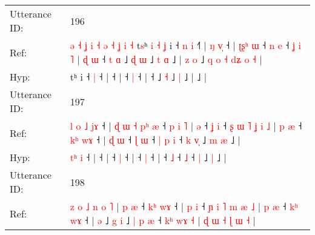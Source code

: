 \documentclass[10pt]{article}
\DeclareRobustCommand{\hl}[1]{{\textcolor{red}{#1}}}
\begin{document}
\begin{longtable}{ll}
 \\
\midrule
Utterance ID: & 196 \\
Ref: & \hl{ə}\hl{ }\hl{˧}\hl{ }\hl{ʝ}\hl{ }\hl{i}\hl{ }\hl{˧}\hl{ }\hl{ə}\hl{ }\hl{˧}\hl{ }\hl{ʝ}\hl{ }\hl{i}\hl{ }\hl{˧}\hl{ }t\hl{s}ʰ\hl{ }\hl{i}\hl{ }\hl{˧}\hl{ }\hl{ʝ} i ˧\hl{ }\hl{n} \hl{i} ˧\hl{˥} |\hl{ }\hl{ŋ}\hl{ }\hl{v}\hl{̩} ˧ |\hl{ }\hl{ʈ}\hl{ʂ}\hl{ʰ}\hl{ }\hl{ɯ} ˧\hl{ }\hl{n} \hl{e} ˧\hl{ }\hl{ʝ}\hl{ }\hl{i}\hl{ }\hl{˥} |\hl{ }\hl{ɖ}\hl{ }\hl{ɯ} ˧\hl{ }\hl{t}\hl{ }\hl{ɑ} ˩\hl{ }\hl{ɖ} \hl{ɯ} ˩\hl{ }\hl{t} \hl{ɑ} ˩ |\hl{ }\hl{z}\hl{ }\hl{o} ˩\hl{ }\hl{q}\hl{ }\hl{o}\hl{ }\hl{˧}\hl{ }\hl{d}\hl{ʑ}\hl{ }\hl{o}\hl{ }\hl{˧} |
 \\
Hyp: & \hl{}\hl{}\hl{}\hl{}\hl{}\hl{}\hl{}\hl{}\hl{}\hl{}\hl{}\hl{}\hl{}\hl{}\hl{}\hl{}\hl{}\hl{}\hl{}\hl{}t\hl{}ʰ\hl{}\hl{}\hl{}\hl{}\hl{}\hl{} i ˧\hl{}\hl{} \hl{|} ˧\hl{} |\hl{}\hl{}\hl{}\hl{}\hl{} ˧ |\hl{}\hl{}\hl{}\hl{}\hl{}\hl{} ˧\hl{}\hl{} \hl{|} ˧\hl{}\hl{}\hl{}\hl{}\hl{}\hl{} |\hl{}\hl{}\hl{}\hl{} ˧\hl{}\hl{}\hl{}\hl{} ˩\hl{}\hl{} \hl{˧} ˩\hl{}\hl{} \hl{|} ˩ |\hl{}\hl{}\hl{}\hl{} ˩\hl{}\hl{}\hl{}\hl{}\hl{}\hl{}\hl{}\hl{}\hl{}\hl{}\hl{}\hl{}\hl{} |
 \\
\midrule
Utterance ID: & 197 \\
Ref: & \hl{l}\hl{ }\hl{o}\hl{ }\hl{˩} \hl{j}\hl{ɤ} ˧ |\hl{ }\hl{ɖ}\hl{ }\hl{ɯ}\hl{ }\hl{˧}\hl{ }\hl{p}\hl{ʰ}\hl{ }\hl{æ} ˧\hl{ }\hl{p}\hl{ }\hl{i}\hl{ }\hl{˥} |\hl{ }\hl{ə} ˧\hl{ }\hl{ʝ} \hl{i} ˧\hl{ }\hl{ʂ}\hl{ }\hl{ɯ}\hl{ }\hl{˥}\hl{ }\hl{ʝ}\hl{ }\hl{i}\hl{ }\hl{˩} |\hl{ }\hl{p}\hl{ }\hl{æ} ˧\hl{ }\hl{k}\hl{ʰ} \hl{w}\hl{ɤ} ˧ |\hl{ }\hl{ɖ}\hl{ }\hl{ɯ} ˧\hl{ }\hl{ɭ} \hl{ɯ} ˧\hl{ }\hl{|}\hl{ }\hl{p} \hl{i} ˧\hl{ }\hl{k} \hl{v}\hl{̩} ˩\hl{ }\hl{m} \hl{æ} ˩ |
 \\
Hyp: & \hl{}\hl{}\hl{}\hl{t}\hl{ʰ} \hl{}\hl{i} ˧ |\hl{}\hl{}\hl{}\hl{}\hl{}\hl{}\hl{}\hl{}\hl{}\hl{}\hl{} ˧\hl{}\hl{}\hl{}\hl{}\hl{}\hl{} |\hl{}\hl{} ˧\hl{}\hl{} \hl{|} ˧\hl{}\hl{}\hl{}\hl{}\hl{}\hl{}\hl{}\hl{}\hl{}\hl{}\hl{}\hl{} |\hl{}\hl{}\hl{}\hl{} ˧\hl{}\hl{}\hl{} \hl{}\hl{|} ˧ |\hl{}\hl{}\hl{}\hl{} ˧\hl{}\hl{} \hl{˩} ˧\hl{}\hl{}\hl{}\hl{} \hl{˩} ˧\hl{}\hl{} \hl{}\hl{|} ˩\hl{}\hl{} \hl{|} ˩ |
 \\
\midrule
Utterance ID: & 198 \\
Ref: & \hl{z}\hl{ }\hl{o}\hl{ }\hl{˩}\hl{ }\hl{n} \hl{o} \hl{˥} |\hl{ }\hl{p}\hl{ }\hl{æ} ˧\hl{ }\hl{k}\hl{ʰ} \hl{w}\hl{ɤ} ˧ |\hl{ }\hl{p}\hl{ }\hl{i} ˧\hl{ }\hl{ɲ}\hl{ }\hl{i}\hl{ }\hl{˥}\hl{ }\hl{m}\hl{ }\hl{æ}\hl{ }\hl{˩} |\hl{ }\hl{p}\hl{ }\hl{æ} ˧\hl{ }\hl{k}\hl{ʰ} \hl{w}\hl{ɤ} ˧ | \hl{ə} ˩\hl{ }\hl{g} \hl{i} ˩\hl{ }\hl{|}\hl{ }\hl{p}\hl{ }\hl{æ} ˧\hl{ }\hl{k}\hl{ʰ}\hl{ }\hl{w}\hl{ɤ} \hl{˧} |\hl{ }\hl{ɖ}\hl{ }\hl{ɯ}\hl{ }\hl{˧}\hl{ }\hl{ɭ}\hl{ }\hl{ɯ} \hl{˧} |

\end{longtable}
\end{document}
